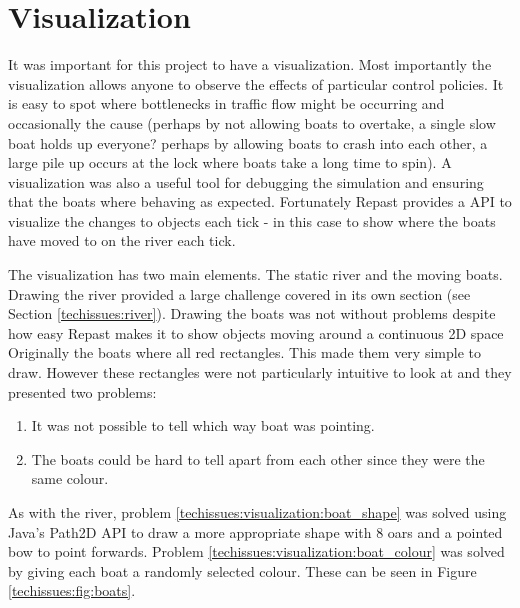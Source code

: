   \section{Visualization}
    It was important for this project to have a visualization. Most importantly the visualization allows anyone to observe the effects of particular control policies. It is easy to spot where bottlenecks in traffic flow might be occurring and occasionally the cause (perhaps by not allowing boats to overtake, a single slow boat holds up everyone? perhaps by allowing boats to crash into each other, a large pile up occurs at the lock where boats take a long time to spin). A visualization was also a useful tool for debugging the simulation and ensuring that the boats where behaving as expected. Fortunately Repast provides a API to visualize the changes to objects each tick - in this case to show where the boats have moved to on the river each tick.
    
    The visualization has two main elements. The static river and the moving boats. Drawing the river provided a large challenge covered in its own section (see Section \ref{techissues:river}). Drawing the boats was not without problems despite how easy Repast makes it to show objects moving around a continuous 2D space Originally the boats where all red rectangles. This made them very simple to draw. However these rectangles were not particularly intuitive to look at and they presented two problems:
    \begin{enumerate}
      \item \label{techissues:visualization:boat_shape} It was not possible to tell which way boat was pointing.
      \item \label{techissues:visualization:boat_colour} The boats could be hard to tell apart from each other since they were the same colour. 
    \end{enumerate}
    As with the river, problem \ref{techissues:visualization:boat_shape} was solved using Java's Path2D API to draw a more appropriate shape with 8 oars and a pointed bow to point forwards. Problem \ref{techissues:visualization:boat_colour} was solved by giving each boat a randomly selected colour. These can be seen in Figure \ref{techissues:fig:boats}.
    
